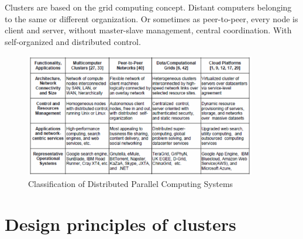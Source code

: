 \documentclass[12pt]{report}
\begin{document}
Clusters are based on the grid computing concept. Distant computers belonging to the same or different organization. Or sometimes as peer-to-peer, every node is client and server, without master-slave management, central coordination. With self-organized and distributed control.

\begin{figure}[ht]
\centering
     \includegraphics[width=0.9\textwidth]{classification.png}
      \caption{Classification of Distributed Parallel Computing Systems \cite{mainbook}}
       \label{classifictaion}
\end{figure} 

\section{Design principles of clusters}
\end{document}
